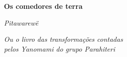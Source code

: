 

\begingroup\thispagestyle{empty}\vspace*{.05\textheight} 

              \formular
              \huge
              \noindent
              \textbf{Os comedores de terra}
              
              \vspace{0.3em}

              \noindent\Large\textit{Pitawarewë}

              \vspace{0.6em}

              \noindent\normalsize\textit{Ou o livro das transformações contadas\\pelos Yanomami do  grupo Parahiteri}
                    
\endgroup
\vfill
\pagebreak
